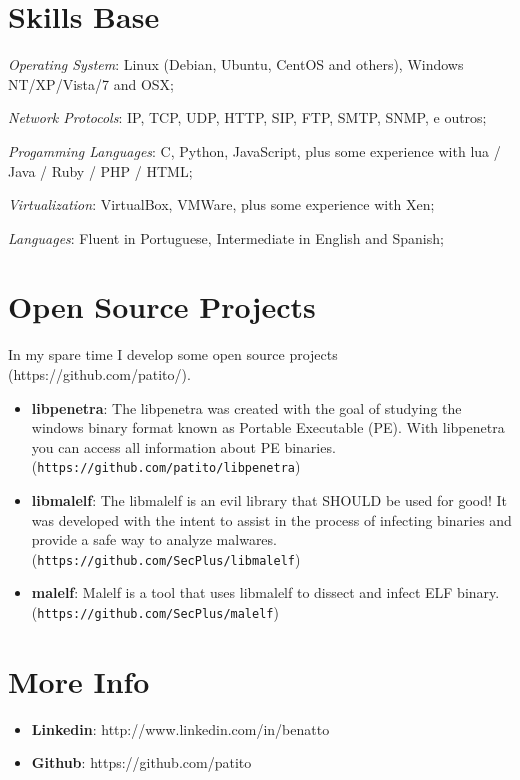 \documentclass[margin]{res}
\begin{document}
\begin{resume}
\section{Skills Base}  \textit{Operating System}:  Linux (Debian, Ubuntu, CentOS and others), Windows NT/XP/Vista/7 and OSX;

			\textit{Network Protocols}: IP, TCP, UDP, HTTP, SIP, FTP, SMTP, SNMP, e outros;
  
			\textit{Progamming Languages}: C, Python, JavaScript, plus some experience with lua / Java / Ruby / PHP / HTML;
  
			\textit{Virtualization}: VirtualBox, VMWare, plus some experience with Xen;

			\textit{Languages}: Fluent in Portuguese, Intermediate in English and Spanish;
 
\section{Open Source Projects}
		In my spare time I develop some open source projects (https://github.com/patito/).
		
		\begin{itemize}
		\vspace{2mm}
		\item \textbf{libpenetra}: The libpenetra was created with the goal of studying the windows binary format known as Portable Executable (PE). With libpenetra you can access all information about PE binaries. (\texttt{https://github.com/patito/libpenetra})\vspace{1mm}	
		\item \textbf{libmalelf}: The libmalelf is an evil library that SHOULD be used for good! It was developed with the intent to assist in the process of infecting binaries and provide a safe way to analyze malwares. (\texttt{https://github.com/SecPlus/libmalelf})\vspace{1mm}
		\item \textbf{malelf}: Malelf is a tool that uses libmalelf to dissect and infect ELF binary. (\texttt{https://github.com/SecPlus/malelf})
		\end{itemize}
 
\section{More Info}
    \begin{itemize}
     \item \textbf{Linkedin}: http://www.linkedin.com/in/benatto
     \item \textbf{Github}: https://github.com/patito
    \end{itemize}


\end{resume} 
\end{document}
